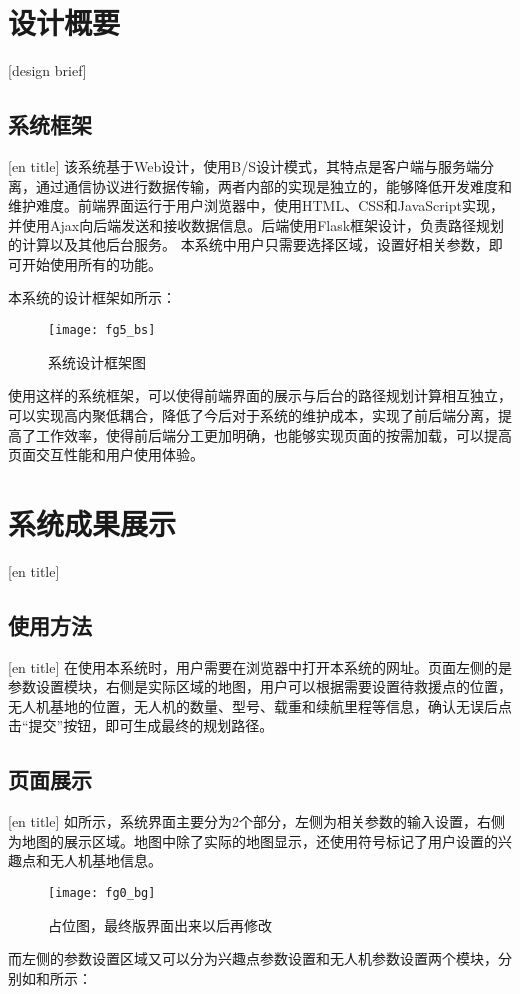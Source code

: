 \section{设计概要}[design brief]
\subsection{系统框架}[en title]
该系统基于Web设计，使用B/S设计模式，其特点是客户端与服务端分离，通过通信协议进行数据传输，两者内部的实现是独立的，能够降低开发难度和维护难度。前端界面运行于用户浏览器中，使用HTML、CSS和JavaScript实现，并使用Ajax向后端发送和接收数据信息。后端使用Flask框架设计，负责路径规划的计算以及其他后台服务。
本系统中用户只需要选择区域，设置好相关参数，即可开始使用所有的功能。


本系统的设计框架如所示：

\begin{figure}[ht]
	\centering
	\texttt{[image: fg5\_bs]}
	\caption{系统设计框架图}
	\label{fg601}
\end{figure}


使用这样的系统框架，可以使得前端界面的展示与后台的路径规划计算相互独立，可以实现高内聚低耦合，降低了今后对于系统的维护成本，实现了前后端分离，提高了工作效率，使得前后端分工更加明确，也能够实现页面的按需加载，可以提高页面交互性能和用户使用体验。

\section{系统成果展示}[en title]
\subsection{使用方法}[en title]
在使用本系统时，用户需要在浏览器中打开本系统的网址。页面左侧的是参数设置模块，右侧是实际区域的地图，用户可以根据需要设置待救援点的位置，无人机基地的位置，无人机的数量、型号、载重和续航里程等信息，确认无误后点击“提交”按钮，即可生成最终的规划路径。
\subsection{页面展示}[en title]
如所示，系统界面主要分为2个部分，左侧为相关参数的输入设置，右侧为地图的展示区域。地图中除了实际的地图显示，还使用符号标记了用户设置的兴趣点和无人机基地信息。

\begin{figure}[H]
	\centering
	\texttt{[image: fg0\_bg]}
	\caption{占位图，最终版界面出来以后再修改}
	\label{fg602}
\end{figure}
而左侧的参数设置区域又可以分为兴趣点参数设置和无人机参数设置两个模块，分别如和所示：

